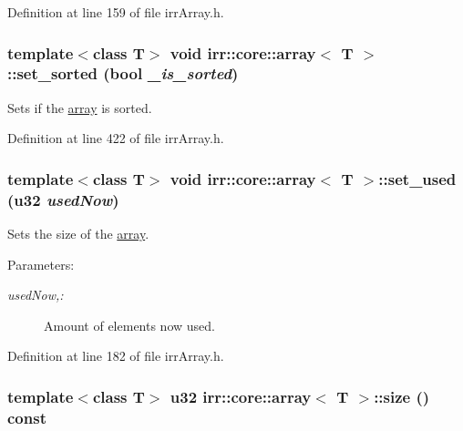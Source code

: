 Definition at line 159 of file irrArray.h.\hypertarget{classirr_1_1core_1_1array_5322149d943e3a5b23dff3000f825a01}{
\subsubsection[{set\_\-sorted}]{\setlength{\rightskip}{0pt plus 5cm}template$<$class T$>$ void {\bf irr::core::array}$<$ T $>$::set\_\-sorted (bool {\em \_\-is\_\-sorted})}}
\label{classirr_1_1core_1_1array_5322149d943e3a5b23dff3000f825a01}


Sets if the \hyperlink{classirr_1_1core_1_1array}{array} is sorted. 



Definition at line 422 of file irrArray.h.\hypertarget{classirr_1_1core_1_1array_0767f2095c59d44a73abf4a9fa9480ba}{
\subsubsection[{set\_\-used}]{\setlength{\rightskip}{0pt plus 5cm}template$<$class T$>$ void {\bf irr::core::array}$<$ T $>$::set\_\-used ({\bf u32} {\em usedNow})}}
\label{classirr_1_1core_1_1array_0767f2095c59d44a73abf4a9fa9480ba}


Sets the size of the \hyperlink{classirr_1_1core_1_1array}{array}. \begin{Desc}
\item[Parameters:]
\begin{description}
\item[{\em usedNow,:}]Amount of elements now used. \end{description}
\end{Desc}


Definition at line 182 of file irrArray.h.\hypertarget{classirr_1_1core_1_1array_d63ccc83da39943532c7af164c7b7bcf}{
\subsubsection[{size}]{\setlength{\rightskip}{0pt plus 5cm}template$<$class T$>$ {\bf u32} {\bf irr::core::array}$<$ T $>$::size () const}}
\label{classirr_1_1core_1_1array_d63ccc83da39943532c7af164c7b7bcf}


